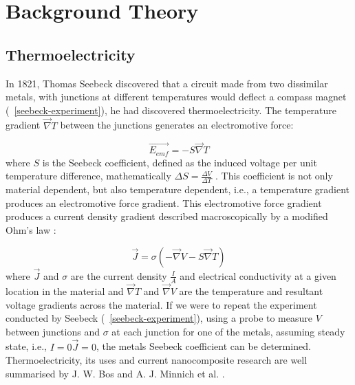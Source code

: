 \documentclass[a4paper,12pt]{article}
\newcommand{\figref}[2][\figurename~]{#1\ref{#2}}
\begin{document}
\section{Background Theory}

\subsection{Thermoelectricity}
In 1821, Thomas Seebeck discovered that a circuit made from two
dissimilar metals, with junctions at different temperatures would
deflect a compass magnet (\figref{seebeck-experiment}), he had
discovered thermoelectricity. The temperature gradient $\vec{\nabla}
T$ between the junctions generates an electromotive force:

\begin{equation}
\label{seebeck-emf}
	\vec{E_{emf}} = -S \vec{\nabla} T
\end{equation}
where $S$ is the Seebeck coefficient, defined as the induced voltage per
unit temperature difference, mathematically $\Delta S = \frac{\Delta
V}{\Delta T}$ \cite{auparay}. This coefficient is not only material
dependent, but also temperature dependent, i.e., a temperature gradient
produces an electromotive force gradient. This electromotive force
gradient produces a current density gradient described macroscopically
by a modified Ohm's law \cite{ziman}:

\begin{equation}
\label{current-density}
	\vec{J} = \sigma (-\vec{\nabla} V - S \vec{\nabla} T)
\end{equation}
where $\vec{J}$ and $\sigma$ are the current density $\frac{I}{A}$ and
electrical conductivity at a given location in the material and
$\vec{\nabla} T$ and $\vec{\nabla} V$ are the temperature and
resultant voltage gradients across the material. If we were to repeat the
experiment conducted by Seebeck (\figref{seebeck-experiment}), using a
probe to measure $V$ between junctions and $\sigma$ at each junction
for one of the metals, assuming steady state, i.e., $I=0
\vec{J} = 0$, the metals Seebeck coefficient can be determined.\\
Thermoelectricity, its uses and current nanocomposite research are well
summarised by J. W. Bos \cite{bos-review} and A. J. Minnich et al.
\cite{minnich-review}.
\end{document}
